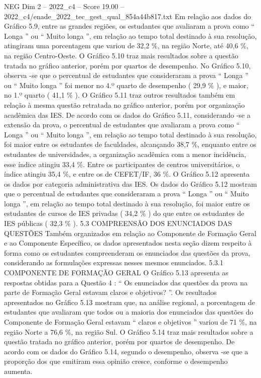 \begin{textsample}{NEG Dim 2 – 2022\_c4 – Score 19.00 – 2022\_c4/enade\_2022\_tec\_gest\_qual\_854a44b817.txt}
Em relação aos dados do Gráfico 5.9, entre as grandes regiões, os estudantes que avaliaram a prova como “ Longa ” ou “ Muito longa ”, em relação ao tempo total destinado à sua resolução, atingiram uma porcentagem que variou de 32,2 \%, na região Norte, até 40,6 \%, na região Centro-Oeste.
O Gráfico 5.10 traz mais resultados sobre a questão tratada no gráfico anterior, porém por quartos de desempenho.
No Gráfico 5.10, observa -se que o percentual de estudantes que consideraram a prova “ Longa ” ou “ Muito longa ” foi menor no 4.º quarto de desempenho ( 29,9 \% ), e maior, no 1.º quarto ( 41,1 \% ).
O Gráfico 5.11 traz outros resultados também em relação à mesma questão retratada no gráfico anterior, porém por organização acadêmica das IES.
De acordo com os dados do Gráfico 5.11, considerando -se a extensão da prova, o percentual de estudantes que avaliaram a prova como “ Longa ” ou “ Muito longa ”, em relação ao tempo total destinado à sua resolução, foi maior entre os estudantes de faculdades, alcançando 38,7 \%, enquanto entre os estudantes de universidades, a organização acadêmica com a menor incidência, esse índice atingiu 33,4 \%.
Entre os participantes de centros universitários, o índice atingiu 35,4 \%, e entre os de CEFET/IF, 36 \%.
O Gráfico 5.12 apresenta os dados por categoria administrativa das IES.
Os dados do Gráfico 5.12 mostram que o percentual de estudantes que consideraram a prova “ Longa ” ou “ Muito longa ”, em relação ao tempo total destinado à sua resolução, foi maior entre os estudantes de cursos de IES privadas ( 34,2 \% ) do que entre os estudantes de IES públicas ( 32,3 \% ). 5.3 COMPREENSÃO DOS ENUNCIADOS DAS QUESTÕES Também organizados em relação ao Componente de Formação Geral e ao Componente Específico, os dados apresentados nesta seção dizem respeito à forma como os estudantes compreenderam os enunciados das questões da prova, considerando as formulações expressas nesses mesmos enunciados. 5.3.1 COMPONENTE DE FORMAÇÃO GERAL O Gráfico 5.13 apresenta as respostas obtidas para a Questão 4 : “ Os enunciados das questões da prova na parte de Formação Geral estavam claros e objetivos? ”.
Os resultados apresentados no Gráfico 5.13 mostram que, na análise regional, a porcentagem de estudantes que avaliaram que todos ou a maioria dos enunciados das questões do Componente de Formação Geral estavam “ claros e objetivos ” variou de 71 \%, na região Norte a 76,6 \%, na região Sul.
O Gráfico 5.14 traz mais resultados sobre a questão tratada no gráfico anterior, porém por quartos de desempenho.
De acordo com os dados do Gráfico 5.14, segundo o desempenho, observa -se que a proporção dos que emitiram essa opinião cresce, conforme o desempenho aumenta.

\end{textsample}
